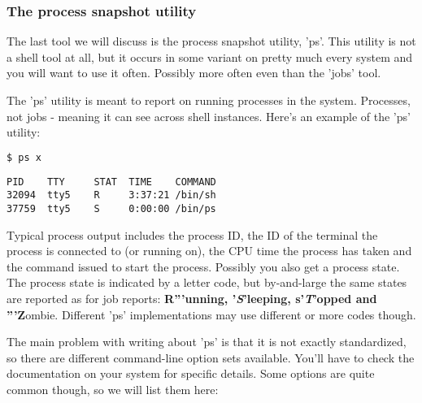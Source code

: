 \subsubsection{The process snapshot utility}
The last tool we will discuss is the process snapshot utility, 'ps'. This
utility is not a shell tool at all, but it occurs in some variant on pretty
much every system and you will want to use it often. Possibly more often even
than the 'jobs' tool.

The 'ps' utility is meant to report on running processes in the system.
Processes, not jobs - meaning it can see across shell instances. Here's an
example of the 'ps' utility:

\lstset{basicstyle=\scriptsize, numbers=left, captionpos=b, tabsize=4}
\begin{lstlisting}[caption=process snapshot,language={bash},
xleftmargin=15pt,label=lst:processsnapshot]
$ ps x
\end{lstlisting}

\scriptsize
\begin{verbatim}
PID    TTY     STAT  TIME    COMMAND
32094  tty5    R     3:37:21 /bin/sh
37759  tty5    S     0:00:00 /bin/ps
\end{verbatim}
\normalsize

Typical process output includes the process ID, the ID of the terminal the
process is connected to (or running on), the CPU time the process has taken and
the command issued to start the process. Possibly you also get a process state.
The process state is indicated by a letter code, but by-and-large the same
states are reported as for job reports: \textbf{R'''unning,
'\textit{S}'leeping, s'\textit{T}'opped and '''Z}ombie. Different 'ps'
implementations may use different or more codes though.

The main problem with writing about 'ps' is that it is not exactly
standardized, so there are different command-line option sets available. You'll
have to check the documentation on your system for specific details. Some
options are quite common though, so we will list them here:

